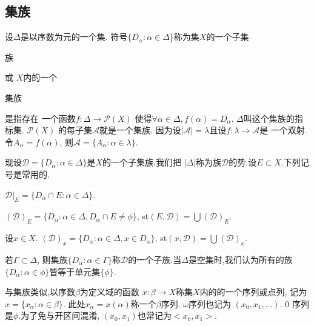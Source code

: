\documentclass[main.tex]{subfiles}
\begin{document}
\subsection{集族}\label{ch1.1.1}
设$\Delta$是以序数为元的一个集.
符号$\{D_\alpha : \alpha\in\Delta\}$称为集$X$的一个子集\begin{kaishu}族\end{kaishu}或
$X$内的一个\begin{kaishu}集族\end{kaishu}是指存在
一个函数$f:\Delta \to \mathscr{P}(X)$
使得$\forall \alpha \in \Delta, f(\alpha)=D_\alpha$.
$\Delta$叫这个集族的指标集. $\mathscr{P}(X)$
的每子集$\mathscr{A}$就是一个集族.
因为设$|\mathscr{A}|=\lambda$且设$f: \lambda\to \mathscr{A}$是
一个双射.令$A_\alpha = f(\alpha)$, 则$\mathscr{A}=\{A_\alpha:\alpha\in\lambda\}$.

现设$\mathscr{D}=\{D_\alpha:\alpha\in\Delta\}$是$X$的一个子集族.我们把
$|\Delta|$称为族$\mathscr{D}$的势.设$E\subset X$.下列记号是常用的.

$\mathscr{D}|_E= \{D_\alpha\cap E: \alpha\in\Delta\}$.

$(\mathscr{D})_E= \{D_\alpha: \alpha\in\Delta, D_\alpha\cap E \ne\phi\}$,
st$(E, \mathscr{D}) = \bigcup(\mathscr{D})_E$.

设$x\in X$. $(\mathscr{D})_x= \{D_\alpha: \alpha\in\Delta, x\in D_\alpha\}$,
st$(x, \mathscr{D}) = \bigcup(\mathscr{D})_x$.

若$\Gamma\subset\Delta$, 则集族$\{D_\alpha : \alpha\in\Gamma\}$称$\mathscr{D}$的一个子族.当$\Delta$是空集时,我们认为所有的族$\{D_\alpha : \alpha\in\phi\}$皆等于单元集$\{\phi\}$.

与集族类似,以序数$\beta$为定义域的函数
$x: \beta\to X$称集$X$内的的一个序列或点列, 记为$x=\{x_\alpha : \alpha\in\beta\}$.
此处$x_\alpha=x(\alpha)$称一个$\beta$序列. $\omega$序列也记为
$(x_0, x_1, \dots)$. 0 序列是$\phi$.为了免与开区间混淆, $(x_0, x_1)$也常记为$<x_0, x_1>$.

\end{document}
